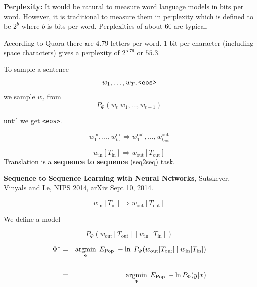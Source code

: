 {\vfill
{\bf Perplexity:}
It would be natural to measure word language models in bits per word.  However, it is traditional to measure them in perplexity which is defined to be
$2^b$ where $b$ is bits per word.  Perplexities of about 60 are typical.

\vfill
According to Quora there are 4.79 letters per word.  1 bit per character (including space characters) gives a perplexity of $2^{5.79}$ or $55.3$.


To sample a sentence
\vfill
$$w_1,\ldots, w_T, \mbox{\tt <eos>}$$
\vfill
we sample $w_t$ from
\vfill
$$P_\Phi(w_t|w_1,\ldots,w_{t-1})$$

\vfill
until we get {\tt <eos>}.




$$w^{\mathrm{in}}_1,\ldots,w^{\mathrm{in}}_{t_{\mathrm{in}}} \Rightarrow w^{\mathrm{out}}_1,\ldots,w^{\mathrm{out}}_{t_{\mathrm{out}}}$$

$$w_{\mathrm{in}}[T_{\mathrm{in}}] \Rightarrow w_{\mathrm{out}}[T_{\mathrm{out}}]$$
\vfill
Translation is a {\bf sequence to sequence} (seq2seq) task.

\vfill
{\bf Sequence to Sequence Learning with Neural Networks}, Sutskever, Vinyals and Le, NIPS 2014, arXiv Sept 10, 2014.




$$w_{\mathrm{in}}[T_{\mathrm{in}}] \Rightarrow w_{\mathrm{out}}[T_{\mathrm{out}}]$$

\vfill
We define a model

\vfill
$$P_\Phi\left(w_{\mathrm{out}}[T_{\mathrm{out}}]\;|\; w_{\mathrm{in}}[T_\mathrm{in}]\right)$$

\vfill
\begin{eqnarray*}
\Phi^*  & = & \operatorname*{argmin}_\Phi\; E_{\mathrm{Pop}} \;-\ln\;P_\Phi(w_{\mathrm{out}}[T_{\mathrm{out}}] \;|\; w_{\mathrm{in}}[T_{\mathrm{in}}]) \\
\\
& = & \operatorname*{argmin}_\Phi \; E_{\mathrm{Pop}} \; -\ln P_\Phi(y|x)
\end{eqnarray*}


}
